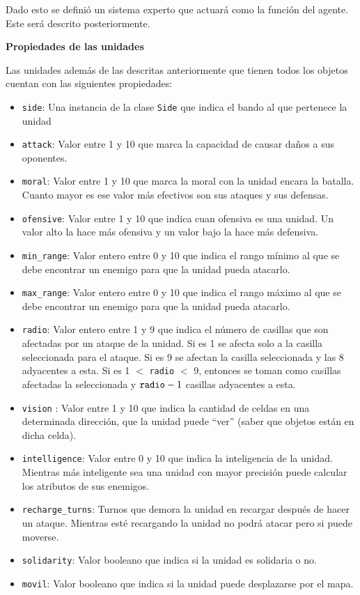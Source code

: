 Dado esto se definió un sistema experto que actuará como la función del agente. Este será descrito posteriormente.

\textbf{Propiedades de las unidades}

Las unidades además de las descritas anteriormente que tienen todos los objetos cuentan con las siguientes propiedades:

\begin{itemize}
	\item \verb|side|: Una instancia de la clase \verb|Side| que indica el bando al que pertenece la unidad
	\item \verb|attack|: Valor entre 1 y 10 que marca la capacidad de causar daños a sus oponentes.
	\item \verb|moral|: Valor entre 1 y 10 que marca la moral con la unidad encara la batalla. Cuanto mayor es ese valor más efectivos son sus ataques y sus defensas.
	\item \verb|ofensive|: Valor entre 1 y 10 que indica cuan ofensiva es una unidad. Un valor alto la hace más ofensiva y un valor bajo la hace más defensiva.
	\item \verb|min_range|: Valor entero entre 0 y 10 que indica el rango mínimo al que se debe encontrar un enemigo para que la unidad pueda atacarlo.
	\item \verb|max_range|: Valor entero entre 0 y 10 que indica el rango máximo al que se debe encontrar un enemigo para que la unidad pueda atacarlo.
	\item \verb|radio|: Valor entero entre 1 y 9 que indica el número de casillas que son afectadas por un ataque de la unidad. Si es 1 se afecta solo a la casilla seleccionada para el ataque. Si es 9 se afectan la casilla seleccionada y las 8 adyacentes a esta. Si es 1 $<$ \verb|radio| $<$ 9, entonces se toman como casillas afectadas la seleccionada y $\verb|radio|-1$ casillas adyacentes a esta.
	\item \verb|vision| : Valor entre 1 y 10 que indica la cantidad de celdas en una determinada dirección, que la unidad puede ``ver'' (saber que objetos están en dicha celda).   
	\item \verb|intelligence|: Valor entre 0 y 10 que indica la inteligencia de la unidad. Mientras más inteligente sea una unidad con mayor precisión puede calcular los atributos de sus enemigos.
	\item \verb|recharge_turns|: Turnos que demora la unidad en recargar después de hacer un ataque. Mientras esté recargando la unidad no podrá atacar pero si puede moverse.
	\item \verb|solidarity|: Valor booleano que indica si la unidad es solidaria o no.
	\item \verb|movil|: Valor booleano que indica si la unidad puede desplazarse por el mapa.  
\end{itemize}

